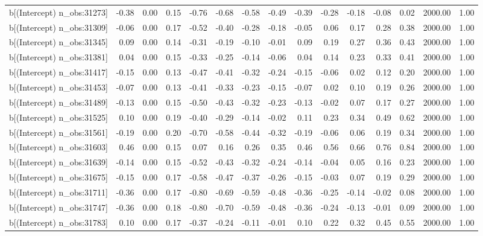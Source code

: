 \begin{table}[ht]
\begin{tabular}{rrrrrrrrrrrrrrr}
  b[(Intercept) n\_obs:31273] & -0.38 & 0.00 & 0.15 & -0.76 & -0.68 & -0.58 & -0.49 & -0.39 & -0.28 & -0.18 & -0.08 & 0.02 & 2000.00 & 1.00 \\ 
  b[(Intercept) n\_obs:31309] & -0.06 & 0.00 & 0.17 & -0.52 & -0.40 & -0.28 & -0.18 & -0.05 & 0.06 & 0.17 & 0.28 & 0.38 & 2000.00 & 1.00 \\ 
  b[(Intercept) n\_obs:31345] & 0.09 & 0.00 & 0.14 & -0.31 & -0.19 & -0.10 & -0.01 & 0.09 & 0.19 & 0.27 & 0.36 & 0.43 & 2000.00 & 1.00 \\ 
  b[(Intercept) n\_obs:31381] & 0.04 & 0.00 & 0.15 & -0.33 & -0.25 & -0.14 & -0.06 & 0.04 & 0.14 & 0.23 & 0.33 & 0.41 & 2000.00 & 1.00 \\ 
  b[(Intercept) n\_obs:31417] & -0.15 & 0.00 & 0.13 & -0.47 & -0.41 & -0.32 & -0.24 & -0.15 & -0.06 & 0.02 & 0.12 & 0.20 & 2000.00 & 1.00 \\ 
  b[(Intercept) n\_obs:31453] & -0.07 & 0.00 & 0.13 & -0.41 & -0.33 & -0.23 & -0.15 & -0.07 & 0.02 & 0.10 & 0.19 & 0.26 & 2000.00 & 1.00 \\ 
  b[(Intercept) n\_obs:31489] & -0.13 & 0.00 & 0.15 & -0.50 & -0.43 & -0.32 & -0.23 & -0.13 & -0.02 & 0.07 & 0.17 & 0.27 & 2000.00 & 1.00 \\ 
  b[(Intercept) n\_obs:31525] & 0.10 & 0.00 & 0.19 & -0.40 & -0.29 & -0.14 & -0.02 & 0.11 & 0.23 & 0.34 & 0.49 & 0.62 & 2000.00 & 1.00 \\ 
  b[(Intercept) n\_obs:31561] & -0.19 & 0.00 & 0.20 & -0.70 & -0.58 & -0.44 & -0.32 & -0.19 & -0.06 & 0.06 & 0.19 & 0.34 & 2000.00 & 1.00 \\ 
  b[(Intercept) n\_obs:31603] & 0.46 & 0.00 & 0.15 & 0.07 & 0.16 & 0.26 & 0.35 & 0.46 & 0.56 & 0.66 & 0.76 & 0.84 & 2000.00 & 1.00 \\ 
  b[(Intercept) n\_obs:31639] & -0.14 & 0.00 & 0.15 & -0.52 & -0.43 & -0.32 & -0.24 & -0.14 & -0.04 & 0.05 & 0.16 & 0.23 & 2000.00 & 1.00 \\ 
  b[(Intercept) n\_obs:31675] & -0.15 & 0.00 & 0.17 & -0.58 & -0.47 & -0.37 & -0.26 & -0.15 & -0.03 & 0.07 & 0.19 & 0.29 & 2000.00 & 1.00 \\ 
  b[(Intercept) n\_obs:31711] & -0.36 & 0.00 & 0.17 & -0.80 & -0.69 & -0.59 & -0.48 & -0.36 & -0.25 & -0.14 & -0.02 & 0.08 & 2000.00 & 1.00 \\ 
  b[(Intercept) n\_obs:31747] & -0.36 & 0.00 & 0.18 & -0.80 & -0.70 & -0.59 & -0.48 & -0.36 & -0.24 & -0.13 & -0.01 & 0.09 & 2000.00 & 1.00 \\ 
  b[(Intercept) n\_obs:31783] & 0.10 & 0.00 & 0.17 & -0.37 & -0.24 & -0.11 & -0.01 & 0.10 & 0.22 & 0.32 & 0.45 & 0.55 & 2000.00 & 1.00 \\ 

\end{tabular}
\end{table}
